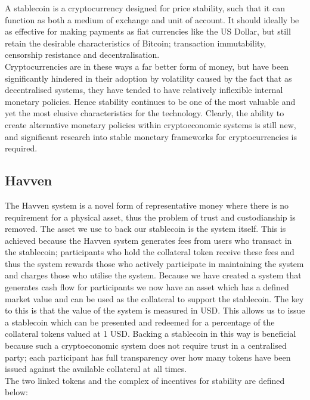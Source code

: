 \noindent A stablecoin is a cryptocurrency designed for price stability, such that it can function as
both a medium of exchange and unit of account. It should ideally be as effective for making payments
as fiat currencies like the US Dollar, but still retain the desirable characteristics of Bitcoin;
transaction immutability, censorship resistance and decentralisation. \\

\noindent Cryptocurrencies are in these ways a far better form of money, but have been significantly hindered
in their adoption by volatility caused by the fact that as decentralised systems, they have tended to have relatively inflexible internal
monetary policies. Hence stability continues to be one of the most valuable and yet the most elusive
characteristics for the technology. Clearly, the ability to create alternative monetary policies within
cryptoeconomic systems is still new, and significant research into stable monetary
frameworks for cryptocurrencies is required.

\subsection{Havven}
\noindent The Havven system is a novel form of representative money where there is no requirement for a physical asset, thus the problem of trust and custodianship is removed. The asset we use to back our stablecoin is the system itself. This is achieved because the Havven system generates fees from users who transact in the stablecoin; participants who hold the collateral token receive these fees and thus the system rewards those who actively participate in maintaining the system and charges those who utilise the system. Because we have created a system that generates cash flow for participants we now have an asset which has a defined market value and can be used as the collateral to support the stablecoin. The key to this is that the value of the system is measured in USD. This allows us to issue a stablecoin which can be presented and redeemed for a percentage of the collateral tokens valued at 1 USD. Backing a stablecoin in this way is beneficial because such a cryptoeconomic system does not require trust in a centralised party; each participant has full transparency over how many tokens have been issued against the available collateral at all times. \\

\noindent The two linked tokens and the complex of incentives for stability are defined below:

